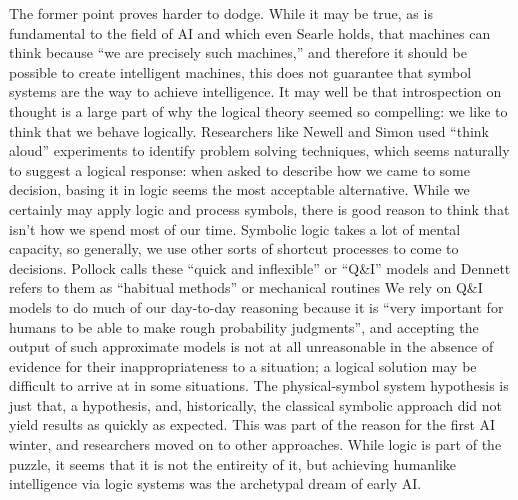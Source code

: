 The former point proves harder to dodge. While it may be true, as is
fundamental to the field of AI and which even Searle holds, that
machines can think because ``we are precisely such machines,''\cite[p.
83]{chineseSearle} and therefore it should be possible to create
intelligent machines, this does not guarantee that symbol systems are
the way to achieve intelligence. It may well be that introspection on
thought is a large part of why the logical theory seemed so
compelling:  we like to think that we behave logically. Researchers like Newell
and Simon used ``think aloud'' experiments to identify problem solving
techniques,\cite[Ch. 10]{mccorduck} which seems naturally to suggest a
logical response:  when
asked to describe how we came to some decision, basing it in logic
seems the most acceptable alternative. While we certainly may apply logic
and process symbols, there is good reason to think that isn't how we
spend most of our time. Symbolic logic takes a lot of mental capacity,
so generally, we use other sorts of shortcut processes to come to
decisions. Pollock calls these ``quick and inflexible'' or ``Q\&I''
models\cite[p. 120]{pollock} and Dennett refers to them as ``habitual methods'' or
mechanical routines\cite[p. 157]{dennett} We rely on Q\&I models to do
much of our day-to-day reasoning because it is ``very important for
humans to be able to make rough probability judgments''\cite[p.
  120]{pollock}, and accepting the output of such approximate models
is not at all unreasonable in the absence of evidence for their
inappropriateness to a situation; a logical solution may be difficult
to arrive at in some situations. The physical-symbol system hypothesis
is just that, a hypothesis, and, historically, the classical symbolic
approach did not yield results as quickly as expected. This was part
of the reason for the first AI winter, and researchers moved on to
other approaches. While logic is part of the puzzle, it seems that it
is not the entireity of it, but achieving humanlike intelligence via logic
systems was the archetypal dream of early AI.

